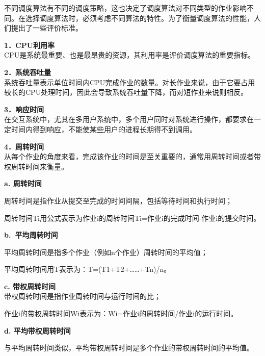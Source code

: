不同调度算法有不同的调度策略，这也决定了调度算法对不同类型的作业影响不同。在选择调度算法时，必须考虑不同算法的特性。为了衡量调度算法的性能，人们提出了一些评价标准。

\textbf{{1．CPU利用率}}\\

CPU是系统最重要、也是最昂贵的资源，其利用率是评价调度算法的重要指标。

\textbf{{2．系统吞吐量}}\\

系统吞吐量表示单位时间内CPU完成作业的数量。对长作业来说，由于它要占用较长的CPU处理时间，因此会导致系统吞吐量下降，而对短作业来说则相反。

\textbf{{3．响应时间}}\\

在交互系统中，尤其在多用户系统中，多个用户同时对系统进行操作，都要求在一定时间内得到响应，不能使某些用户的进程长期得不到调用。

\textbf{{4．周转时间}}\\

从每个作业的角度来看，完成该作业的时间是至关重要的，通常用周转时间或者带权周转时间来衡量。

\textbf{a. 周转时间}

周转时间是指作业从提交至完成的时间间隔，包括等待时间和执行时间；

周转时间Ti用公式表示为{作业i的周转时间Ti=作业i的完成时间-作业i的提交时间。}

\textbf{b.~平均周转时间}

平均周转时间是指多个作业（例如n个作业）周转时间的平均值；

平均周转时间用T表示为：{T=(T1+T2+\ldots{}\ldots{}+Tn)/n。}

\textbf{c. 带权周转时间}\\

带权周转时间是指作业周转时间与运行时间的比；

作业i的带权周转时间Wi表示为：{Wi=作业i的周转时间/作业i的运行时间。}

\textbf{d. 平均带权周转时间}

与平均周转时间类似，平均带权周转时间是多个作业的带权周转时间的平均值。
